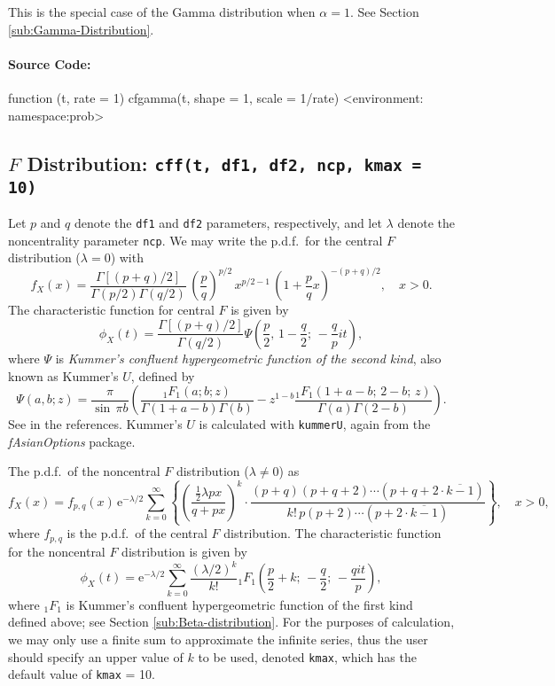 \documentclass[english]{article}
\newcommand{\Rpackage}[1]{{\textit{#1}}}
\newcommand{\me}{\mathrm{e}}
\begin{document}
This is the special case of the Gamma distribution when $\alpha=1$.
See Section \ref{sub:Gamma-Distribution}.


\paragraph*{Source Code:}

\begin{Schunk}
\begin{Soutput}
function (t, rate = 1) 
{
    cfgamma(t, shape = 1, scale = 1/rate)
}
<environment: namespace:prob>
\end{Soutput}
\end{Schunk}


\subsection{$F$ Distribution: \texttt{cff(t, df1, df2, ncp, kmax = 10)}}

Let $p$ and $q$ denote the \texttt{df1} and \texttt{df2} parameters,
respectively, and let $\lambda$ denote the noncentrality parameter
\texttt{ncp}. We may write the p.d.f.~for the central $F$ distribution
($\lambda=0$) with\[
f_{X}(x)=\frac{\Gamma[(p+q)/2]}{\Gamma(p/2)\Gamma(q/2)}\,\left(\frac{p}{q}\right)^{p/2}\, x^{p/2-1}\,\left(1+\frac{p}{q}x\right)^{-(p+q)/2},\quad x>0.\]
The characteristic function for central $F$ is given by\[
\phi_{X}(t)=\frac{\Gamma[(p+q)/2]}{\Gamma(q/2)}\Psi\left(\frac{p}{2},\,1-\frac{q}{2};\,-\frac{q}{p}it\right),\]
where $\Psi$ is \emph{Kummer's confluent hypergeometric function
of the second kind}, also known as Kummer's $U$, defined by\[
\Psi(a,b;z)=\frac{\pi}{\sin\,\pi b}\left(\frac{_{1}F_{1}(a;b;z)}{\Gamma(1+a-b)\Gamma(b)}-z^{1-b}\frac{_{1}F_{1}(1+a-b;\,2-b;\, z)}{\Gamma(a)\Gamma(2-b)}\right).\]
See \cite{confHyp} in the references. Kummer's $U$ is calculated
with \texttt{kummerU}, again from the \Rpackage{fAsianOptions} package. 

The p.d.f.~of the noncentral $F$ distribution ($\lambda\neq0$)
as\[
f_{X}(x)=f_{p,q}(x)\,\me^{-\lambda/2}\sum_{k=0}^{\infty}\left\{ \left(\frac{\frac{1}{2}\lambda px}{q+px}\right)^{k}\cdot\frac{(p+q)(p+q+2)\cdots(p+q+2\cdot\overline{k-1})}{k!\, p(p+2)\cdots(p+2\cdot\overline{k-1})}\right\} ,\quad x>0,\]
where $f_{p,q}$ is the p.d.f.~of the central $F$ distribution.
The characteristic function for the noncentral $F$ distribution is
given by \[
\phi_{X}(t)=\me^{-\lambda/2}\sum_{k=0}^{\infty}\frac{(\lambda/2)^{k}}{k!}{}_{1}F_{1}\left(\frac{p}{2}+k;\,-\frac{q}{2};\,-\frac{qit}{p}\right),\]
where $_{1}F_{1}$ is Kummer's confluent hypergeometric function of
the first kind defined above; see Section \ref{sub:Beta-distribution}.
For the purposes of calculation, we may only use a finite sum to approximate
the infinite series, thus the user should specify an upper value of
$k$ to be used, denoted \texttt{kmax}, which has the default value
of \texttt{kmax} = 10. 
\end{document}
